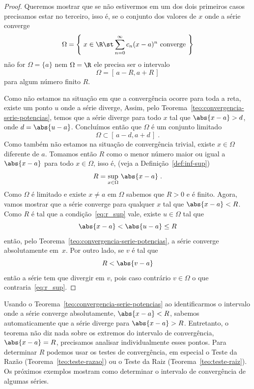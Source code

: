 \begin{proof}
  Queremos mostrar que se não estivermos em um dos dois primeiros casos
  precisamos estar no terceiro, isso é, se o conjunto dos valores de $x$
  onde a série converge
  \[
    \Omega = \left\{ \; x\in\R \st \sum_{n=0}^\infty c_n(x-a)^n \text{ converge } \right\}
  \]
  não for $\Omega=\{a\}$ nem $\Omega=\R$ ele precisa ser o intervalo
  \[
    \Omega = [\, a-R, a+R \,]
  \]
  para algum número finito $R$.

  Como não estamos na situação em que a convergência ocorre para toda a reta,
  existe um ponto $u$ onde a série diverge,
  Assim, pelo Teorema~\ref{teo:convergencia-serie-potencias},
  temos que a série diverge para todo $x$ tal que $\abs{x-a}>d$, onde $d=\abs{u-a}$.
  Concluímos então que $\Omega$ é um conjunto limitado
  \[
  	\Omega\subset [\, a-d, a+d \,]   \;.
  \]
  Como também não estamos na situação de convergência trivial,
  existe $x\in \Omega$ diferente de $a$. Tomamos então $R$
  como o menor número maior ou igual a $\abs{x-a}$ para todo $x\in \Omega$, isso é,
  (veja a Definição~\ref{def:inf-sup})
  \begin{equation}
    \label{eq:r_sup}
    R = \sup_{x\in \Omega} \,\abs{x-a}   \;.
  \end{equation}
  Como $\Omega$ é limitado e existe $x\neq a$ em $\Omega$ sabemos que $R>0$ e é finito.
  Agora, vamos mostrar que a série converge para qualquer $x$ tal que $\abs{x-a}<R$.
  Como $R$ é tal que a condição~\eqref{eq:r_sup} vale, existe $u\in \Omega$ tal que
  \[
    \abs{x-a} < \abs{u-a} \leq R
  \]
  então, pelo Teorema~\ref{teo:convergencia-serie-potencias},
  a série converge absolutamente em~$x$.
  Por outro lado, se $v$ é tal que
  \[
    R < \abs{v-a}
  \]
  então a série tem que divergir em $v$, pois caso contrário $v\in \Omega$ o que
  contraria~\eqref{eq:r_sup}.
\end{proof}

Usando o Teorema~\ref{teo:convergencia-serie-potencias} ao identificarmos
o intervalo onde a série converge absolutamente, $\abs{x-a}<R$,
sabemos automaticamente que a série diverge para $\abs{x-a}>R$.
Entretanto, o teorema não diz nada sobre os extremos do intervalo
de convergência, $\abs{x-a}=R$, precisamos analisar individualmente esses pontos.
Para determinar $R$ podemos usar os testes de convergência, em especial o
Teste da Razão (Teorema~\ref{teo:teste-razao}) ou o
Teste da Raiz (Teorema~\ref{teo:teste-raiz}). Os próximos exemplos mostram como
determinar o intervalo de convergência de algumas séries.

